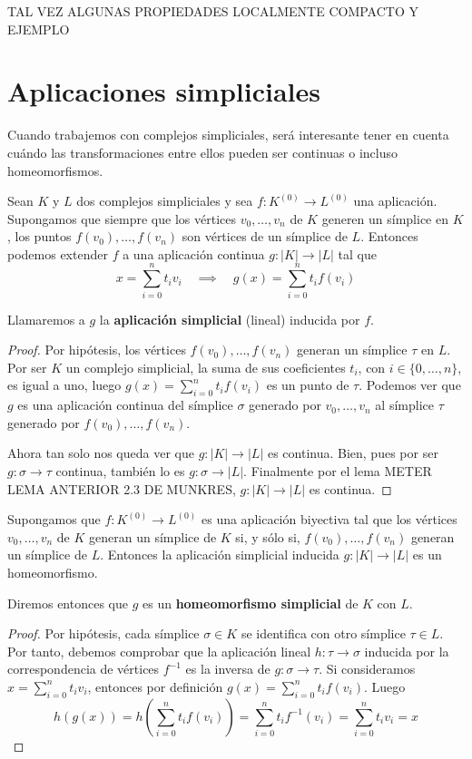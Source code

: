 TAL VEZ ALGUNAS PROPIEDADES LOCALMENTE COMPACTO Y EJEMPLO

\section{Aplicaciones simpliciales}

Cuando trabajemos con complejos simpliciales, será interesante tener en cuenta cuándo las 
transformaciones entre ellos pueden ser continuas o incluso homeomorfismos. 

\begin{lema}
	Sean $K$ y $L$ dos complejos simpliciales y sea $f: K^{(0)} \rightarrow L^{(0)}$ una aplicación. 
	Supongamos que siempre que los vértices $v_0, \dots, v_n$ de $K$ generen un símplice en $K$, 
	los puntos $f(v_0), \dots, f(v_n)$ son vértices de un símplice de $L$. Entonces podemos extender $f$ 
	a una aplicación continua $g:|K| \rightarrow |L|$ tal que
	\[ x = \sum_{i=0}^{n}t_iv_i \quad \implies \quad g(x) = \sum_{i=0}^{n}t_if(v_i) \]
\end{lema}
Llamaremos a $g$ la \textbf{aplicación simplicial} (lineal) inducida por $f$.
\begin{proof}
	Por hipótesis, los vértices $f(v_0), \dots, f(v_n)$ generan un símplice $\tau$ en $L$. Por 
	ser $K$ un complejo simplicial, la suma de sus coeficientes $t_i$, con $i \in \{0, \dots, n\}$,  
	es igual a uno, luego $g(x) = \sum_{i=0}^{n}t_if(v_i)$ es un punto de $\tau$. Podemos ver que 
	$g$ es una aplicación continua del símplice $\sigma$ generado por $v_0, \dots, v_n$ al símplice 
	$\tau$ generado por $f(v_0), \dots, f(v_n)$.
	
	Ahora tan solo nos queda ver que $g:|K| \rightarrow |L|$ es continua. Bien, pues por ser 
	$g: \sigma \rightarrow \tau$ continua, también lo es $g: \sigma \rightarrow |L|$. Finalmente 
	por el lema METER LEMA ANTERIOR 2.3 DE MUNKRES, $g:|K| \rightarrow |L|$ es continua.
\end{proof}

\begin{lema}\label{lem:homeo_complex}
	Supongamos que $f:K^{(0)} \rightarrow L^{(0)}$ es una aplicación biyectiva tal que los vértices 
	$v_0, \dots, v_n$ de $K$ generan un símplice de $K$ si, y sólo si, $f(v_0), \dots, f(v_n)$ 
	generan un símplice de $L$. Entonces la aplicación simplicial inducida $g:|K| \rightarrow |L|$ 
	es un homeomorfismo.
\end{lema}
Diremos entonces que $g$ es un \textbf{homeomorfismo simplicial} de $K$ con $L$.
\begin{proof}
	Por hipótesis, cada símplice $\sigma \in K$ se identifica con otro símplice $\tau \in L$. 
	Por tanto, debemos comprobar que la aplicación lineal $h: \tau \rightarrow \sigma$ inducida por 
	la correspondencia de vértices $f^{-1}$ es la inversa de $g: \sigma \rightarrow \tau$. Si 
	consideramos $x = \sum_{i=0}^{n}t_i v_i$, entonces por definición $g(x) = \sum_{i=0}^{n}t_if(v_i)$.
	Luego
	\[ h(g(x)) = h(\sum_{i=0}^{n}t_if(v_i)) = \sum_{i=0}^{n}t_i f^{-1}(v_i) = \sum_{i=0}^{n}t_i v_i = x \]
	
\end{proof}

